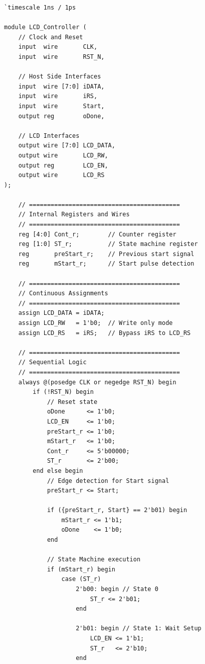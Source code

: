 \documentclass[12pt,a4paper]{article}
\begin{document}
\begin{lstlisting}[style=verilogstyle]
`timescale 1ns / 1ps

module LCD_Controller (
    // Clock and Reset
    input  wire       CLK,
    input  wire       RST_N,
    
    // Host Side Interfaces
    input  wire [7:0] iDATA,
    input  wire       iRS,
    input  wire       Start,
    output reg        oDone,
    
    // LCD Interfaces
    output wire [7:0] LCD_DATA,
    output wire       LCD_RW,
    output reg        LCD_EN,
    output wire       LCD_RS
);

    // ==========================================
    // Internal Registers and Wires
    // ==========================================
    reg [4:0] Cont_r;        // Counter register
    reg [1:0] ST_r;          // State machine register
    reg       preStart_r;    // Previous start signal
    reg       mStart_r;      // Start pulse detection

    // ==========================================
    // Continuous Assignments
    // ==========================================
    assign LCD_DATA = iDATA;
    assign LCD_RW   = 1'b0;  // Write only mode
    assign LCD_RS   = iRS;   // Bypass iRS to LCD_RS

    // ==========================================
    // Sequential Logic
    // ==========================================
    always @(posedge CLK or negedge RST_N) begin
        if (!RST_N) begin
            // Reset state
            oDone      <= 1'b0;
            LCD_EN     <= 1'b0;
            preStart_r <= 1'b0;
            mStart_r   <= 1'b0;
            Cont_r     <= 5'b00000;
            ST_r       <= 2'b00;
        end else begin
            // Edge detection for Start signal
            preStart_r <= Start;
            
            if ({preStart_r, Start} == 2'b01) begin
                mStart_r <= 1'b1;
                oDone    <= 1'b0;
            end
            
            // State Machine execution
            if (mStart_r) begin
                case (ST_r)
                    2'b00: begin // State 0
                        ST_r <= 2'b01;
                    end
                    
                    2'b01: begin // State 1: Wait Setup
                        LCD_EN <= 1'b1;
                        ST_r   <= 2'b10;
                    end
                    

\end{lstlisting}
\end{document}
